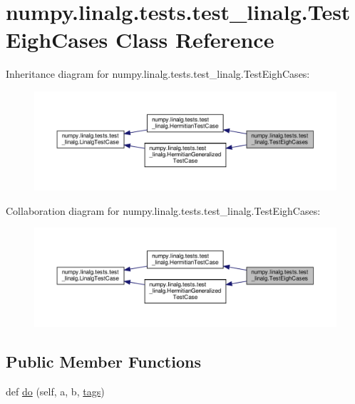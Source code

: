 \hypertarget{classnumpy_1_1linalg_1_1tests_1_1test__linalg_1_1TestEighCases}{}\section{numpy.\+linalg.\+tests.\+test\+\_\+linalg.\+Test\+Eigh\+Cases Class Reference}
\label{classnumpy_1_1linalg_1_1tests_1_1test__linalg_1_1TestEighCases}


Inheritance diagram for numpy.\+linalg.\+tests.\+test\+\_\+linalg.\+Test\+Eigh\+Cases\+:
\nopagebreak
\begin{figure}[H]
\begin{center}
\leavevmode
\includegraphics[width=350pt]{classnumpy_1_1linalg_1_1tests_1_1test__linalg_1_1TestEighCases__inherit__graph}
\end{center}
\end{figure}


Collaboration diagram for numpy.\+linalg.\+tests.\+test\+\_\+linalg.\+Test\+Eigh\+Cases\+:
\nopagebreak
\begin{figure}[H]
\begin{center}
\leavevmode
\includegraphics[width=350pt]{classnumpy_1_1linalg_1_1tests_1_1test__linalg_1_1TestEighCases__coll__graph}
\end{center}
\end{figure}
\subsection*{Public Member Functions}
\begin{DoxyCompactItemize}
\item 
def \hyperlink{classnumpy_1_1linalg_1_1tests_1_1test__linalg_1_1TestEighCases_a8cfaf60643f941853a65942ab2ea3459}{do} (self, a, b, \hyperlink{namespacenumpy_1_1linalg_1_1tests_1_1test__linalg_ac6a064918e74d701a7b5aac0ffefe1e7}{tags})
\end{DoxyCompactItemize}
